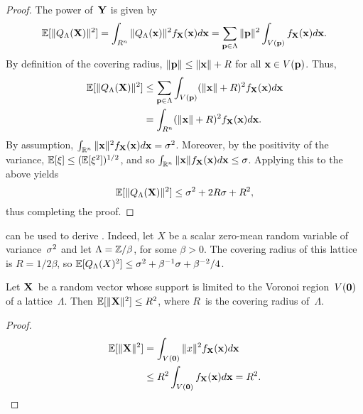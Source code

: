 \begin{subappendices}
  \begin{proof}
    The power of~$\mathbf{Y}$ is given by
    \begin{equation*}
      \mathbb{E}[\|{Q_{\Lambda}}(\mathbf{X})\|^2] = \int_{R^n} \|{Q_{\Lambda}}(\mathbf{x})\|^2 f_{\mathbf{X}}(\mathbf{x}) d\mathbf{x}
      = \sum_{\mathbf{p} \in \Lambda} \|\mathbf{p}\|^2 \int_{V(\mathbf{p})} f_{\mathbf{X}}(\mathbf{x}) d\mathbf{x}.
    \end{equation*}
    By definition of the covering radius, $\|\mathbf{p}\| \le \|\mathbf{x}\| + R$ for all $\mathbf{x}
    \in V(\mathbf{p})$. Thus,
    \begin{align*}
      \mathbb{E}[\|{Q_{\Lambda}}(\mathbf{X})\|^2] &\le \sum_{\mathbf{p} \in \Lambda} \int_{V(\mathbf{p})} (\|\mathbf{x}\| + R)^2
      f_{\mathbf{X}}(\mathbf{x}) d\mathbf{x} \\
      &= \int_{R^n} (\|\mathbf{x}\| + R)^2 f_{\mathbf{X}}(\mathbf{x}) d\mathbf{x}.
    \end{align*}
    By assumption, $\int_{\mathbb{R}^n} \|\mathbf{x}\|^2 f_{\mathbf{X}}(\mathbf{x}) d\mathbf{x} = {\sigma^2}$. Moreover, by the
    positivity of the variance, $\mathbb{E}[\xi] \le (\mathbb{E}[\xi^2])^{1/2}$, and so
    $\int_{\mathbb{R}^n} \|\mathbf{x}\| f_{\mathbf{X}}(\mathbf{x}) d\mathbf{x} \le \sigma$. Applying this to the above
    yields
    \begin{equation*}
      \mathbb{E}[\|{Q_{\Lambda}}(\mathbf{X})\|^2] \le {\sigma^2} + 2R\sigma + R^2,
    \end{equation*}
    thus completing the proof.
  \end{proof}

  \begin{example}
     can be used to derive . Indeed,
    let $X$ be a scalar zero-mean random variable of variance~${\sigma^2}$ and let
    $\Lambda = \mathbb{Z} / \beta$, for some $\beta > 0$. The covering radius of this
    lattice is $R = 1/2\beta$, so $\mathbb{E}[{Q_{\Lambda}}(X)^2] \le {\sigma^2} + \beta^{-1} \sigma +
    \beta^{-2}/4$. 
  \end{example}

  \begin{lemma}
    \label{lem:voronoivarbound}
    Let $\mathbf{X}$~be a random vector whose support is limited to the Voronoi
    region~$V(\mathbf{0})$ of a lattice~$\Lambda$. Then $\mathbb{E}[\|\mathbf{X}\|^2] \le R^2$, where
    $R$~is the covering radius of~$\Lambda$.
  \end{lemma}

  \begin{proof}
    \begin{align*}
      \mathbb{E}[\|\mathbf{X}\|^2] & = \int_{V(\mathbf{0})} \|x\|^2 f_{\mathbf{X}}(\mathbf{x}) d\mathbf{x} \\
      & \le R^2 \int_{V(\mathbf{0})} f_{\mathbf{X}}(\mathbf{x}) d\mathbf{x} = R^2.
    \end{align*}
  \end{proof}





\end{subappendices}
